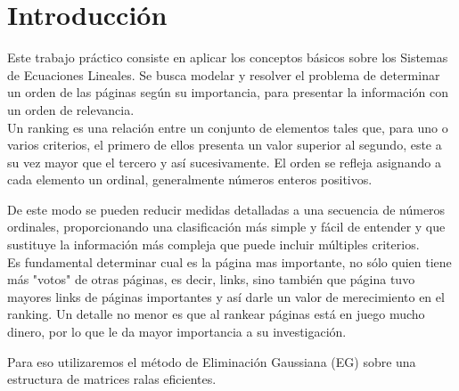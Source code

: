\section{Introducción}
Este trabajo práctico consiste en aplicar los conceptos básicos sobre los Sistemas de Ecuaciones Lineales. Se busca modelar y resolver el problema de determinar un orden de las páginas según su importancia, para presentar la información con un orden de relevancia.\\

Un ranking es una relación entre un conjunto de elementos tales que, para uno o varios criterios, el primero de ellos presenta un valor superior al segundo, este a su vez mayor que el tercero y así sucesivamente. El orden se refleja asignando a cada elemento un ordinal, generalmente números enteros positivos.

De este modo se pueden reducir medidas detalladas a una secuencia de números ordinales, proporcionando una clasificación más simple y fácil de entender y que sustituye la información más compleja que puede incluir múltiples criterios.\\

Es fundamental determinar cual es la página mas importante, no sólo quien tiene más "votos" de otras páginas, es decir, links, sino también que página tuvo mayores links de páginas importantes y así darle un valor de merecimiento en el ranking.
Un detalle no menor es que al rankear páginas está en juego mucho dinero, por lo que le da mayor importancia a su investigación.

Para eso utilizaremos el método de Eliminación Gaussiana (EG) sobre una estructura de matrices ralas eficientes.